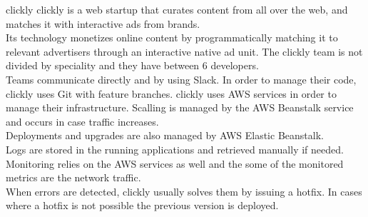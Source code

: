     \begin{companyreport}{clickly}
      \product
      clickly is a web startup that curates content from all over the web, and matches it with interactive ads from brands. \\
      Its technology monetizes online content by programmatically matching it to relevant advertisers through an interactive native ad unit.
      \teams
      The clickly team is not divided by speciality and they have between 6 developers. \\
      Teams communicate directly and by using Slack.
      \development
      In order to manage their code, clickly uses Git with feature branches.
      \operations
      clickly uses AWS services in order to manage their infrastructure. Scalling is managed by the AWS Beanstalk service and occurs in case traffic increases. \\
      Deployments and upgrades are also managed by AWS Elastic Beanstalk. \\
      Logs are stored in the running applications and retrieved manually if needed. \\
      Monitoring relies on the AWS services as well and the some of the monitored metrics are the network traffic. \\
      When errors are detected, clickly usually solves them by issuing a hotfix. In cases where a hotfix is not possible the previous version is deployed.
      \reportend
    \end{companyreport}

